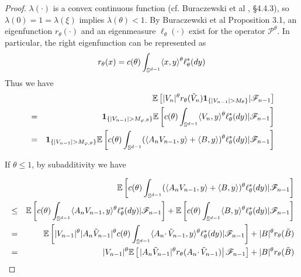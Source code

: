 \begin{proof}
  $\lambda(\cdot)$ is a convex continuous function (cf. Buraczewski et
  al \cite{buraczewski:damek:mikosch:2016}, \S 4.4.3), so
  $\lambda(0) = 1 = \lambda(\xi)$ implies $\lambda(\theta) < 1$.
  By Buraczewski et al \cite{buraczewski:damek:guivarch:mentemeier:2014} 
  Proposition 3.1, an eigenfunction $r_\theta(\cdot)$ and an
  eigenmeasure $\ell_\theta(\cdot)$ exist for the operator
  $\mathscr P^\theta$. 
  In particular, the right eigenfunction can be represented as
  \[
  r_{\theta}(x) = c(\theta) \int_{\mathbb S^{d-1}} \langle x, y\rangle^\theta
  \ell^*_{\theta}(dy)
  \]
  Thus we have
  \begin{eqnarray}
    && \mathbb{E} \left[ |V_n|^\theta r_{\theta}(\tilde V_n)
      \mathbf{1}_{\{|V_{n-1}| > M_{\theta}\}} | \mathscr F_{n-1} \right]
    \label{eq:drift_proof_1} \\
    &=&
    \mathbf{1}_{\{|V_{n-1}| > M_{\varphi, \theta}\}}
    \mathbb{E}
    \left[
      c(\theta)\int_{\mathbb S^{d-1}} \langle V_n, y\rangle^\theta \ell^*_{\theta}(dy)|
      \mathscr F_{n-1} \right]
    \nonumber \\
    &=&
    \mathbf{1}_{\{|V_{n-1}| > M_{\varphi, \theta}\}}
    \mathbb{E}\left[c(\theta)\int_{\mathbb S^{d-1}} (\langle A_n V_{n-1}, y\rangle + \langle B,
        y\rangle)^\theta \ell^*_{\theta}(dy) | \mathscr F_{n-1} \right]
    \nonumber
  \end{eqnarray}
  \begin{case}
    If $\theta \leq 1$, by subadditivity we have
  \end{case}
  \begin{eqnarray*}
    &&\E\left[c(\theta)\int_{\sphere^{d-1}} (\inn{A_n V_{n-1}, y} + \inn{B,
        y})^\theta \ell^*_{\theta}(dy) | \mathscr F_{n-1} \right]\\
    &\leq& \E\left[c(\theta)\int_{\sphere^{d-1}} \inn{A_n V_{n-1}, y}^\theta
      \ell^*_{\theta}(dy) | \mathscr F_{n-1} \right]
    + \E\left[c(\theta)\int_{\sphere^{d-1}} \inn{B, y}^\theta \ell^*_{\theta}(dy) |
      \mathscr F_{n-1} \right] \\
    &=&
    \E\left[|V_{n-1}|^\theta |A_n \tilde V_{n-1}|^\theta
      c(\theta)\int_{\sphere^{d-1}}
      \inn{ A_n \cdotp \tilde V_{n-1}, y}^\theta
      \ell^*_{\theta}(dy) | \mathscr F_{n-1} \right]
    + |B|^\theta r_{\theta}(\tilde B)\\
    &=&
    |V_{n-1}|^\theta
    \E \left[
      \left.
        | A_n  \tilde V_{n-1} |^{\theta}
        r_\theta(A_n \cdotp \tilde V_{n-1})
      \right|
      \mathscr F_{n-1}
    \right]
    + |B|^\theta r_{\theta}(\tilde B) \\

\end{eqnarray*}
\end{proof}
